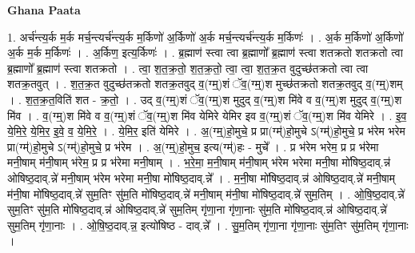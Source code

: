 \documentclass[17pt]{extarticle}
\begin{document}
\textbf{Ghana Paata } \newline

1. अर्च॑न्त्य॒र्क म॒र्क मर्च॒न्त्यर्च॑न्त्य॒र्क म॒र्किणो॑ अ॒र्किणो॑ अ॒र्क मर्च॒न्त्यर्च॑न्त्य॒र्क म॒र्किणः॑ । . अ॒र्क म॒र्किणो॑ अ॒र्किणो॑ अ॒र्क म॒र्क म॒र्किणः॑ । . अ॒र्किण॒ इत्य॒र्किणः॑ । . ब्र॒ह्माण॑ स्त्वा त्वा ब्र॒ह्माणो᳚ ब्र॒ह्माण॑ स्त्वा शतक्रतो शतक्रतो त्वा ब्र॒ह्माणो᳚ ब्र॒ह्माण॑ स्त्वा शतक्रतो । . त्वा॒ श॒त॒क्र॒तो॒ श॒त॒क्र॒तो॒ त्वा॒ त्वा॒ श॒त॒क्र॒त वुदुच्छ॑तक्रतो त्वा त्वा शतक्र॒तवुत् । . श॒त॒क्र॒त वुदुच्छ॑तक्रतो शतक्र॒तवुद् व॒(ग्म्॒)शं ॅव॒(ग्म्॒)श मुच्छ॑तक्रतो शतक्र॒तवुद् व॒(ग्म्॒)शम् । . श॒त॒क्र॒त॒विति॑ शत - क्र॒तो॒ । . उद् व॒(ग्म्॒)शं ॅव॒(ग्म्॒)श मुदुद् व॒(ग्म्॒)श मि॑वे व व॒(ग्म्॒)श मुदुद् व॒(ग्म्॒)श मि॑व । . व॒(ग्म्॒)श मि॑वे व व॒(ग्म्॒)शं ॅव॒(ग्म्॒)श मि॑व येमिरे येमिर इव व॒(ग्म्॒)शं ॅव॒(ग्म्॒)श मि॑व येमिरे । . इ॒व॒ ये॒मि॒रे॒ ये॒मि॒र॒ इ॒वे॒ व॒ ये॒मि॒रे॒ । . ये॒मि॒र॒ इति॑ येमिरे । . अ॒(ग्म्॒)हो॒मुचे॒ प्र प्रा(ग्म्॑)हो॒मुचे ऽ(ग्म्॑)हो॒मुचे॒ प्र भ॑रेम भरेम प्रा(ग्म्॑)हो॒मुचे ऽ(ग्म्॑)हो॒मुचे॒ प्र भ॑रेम । . अ॒(ग्म्॒)हो॒मुच॒ इत्य(ग्म्॑)हः - मुचे᳚ । . प्र भ॑रेम भरेम॒ प्र प्र भ॑रेमा मनी॒षाम् म॑नी॒षाम् भ॑रेम॒ प्र प्र भ॑रेमा मनी॒षाम् । . भ॒रे॒मा॒ म॒नी॒षाम् म॑नी॒षाम् भ॑रेम भरेमा मनी॒षा मो॑षिष्ठ॒दाव्.न्न॑ ओषिष्ठ॒दाव्.न्ने॑ मनी॒षाम् भ॑रेम भरेमा मनी॒षा मो॑षिष्ठ॒दाव्.न्ने᳚ । . म॒नी॒षा मो॑षिष्ठ॒दाव्.न्न॑ ओषिष्ठ॒दाव्.न्ने॑ मनी॒षाम् म॑नी॒षा मो॑षिष्ठ॒दाव्.न्ने॑ सुम॒तिꣳ सु॑म॒ति मो॑षिष्ठ॒दाव्.न्ने॑ मनी॒षाम् म॑नी॒षा मो॑षिष्ठ॒दाव्.न्ने॑ सुम॒तिम् । . ओ॒षि॒ष्ठ॒दाव्.न्ने॑ सुम॒तिꣳ सु॑म॒ति मो॑षिष्ठ॒दाव्.न्न॑ ओषिष्ठ॒दाव्.न्ने॑ सुम॒तिम् गृ॑णा॒ना गृ॑णा॒नाः सु॑म॒ति मो॑षिष्ठ॒दाव्.न्न॑ ओषिष्ठ॒दाव्.न्ने॑ सुम॒तिम् गृ॑णा॒नाः । . ओ॒षि॒ष्ठ॒दाव्.न्न॒ इत्यो॑षिष्ठ - दाव्.न्ने᳚ । . सु॒म॒तिम् गृ॑णा॒ना गृ॑णा॒नाः सु॑म॒तिꣳ सु॑म॒तिम् गृ॑णा॒नाः । \newline
\end{document}
